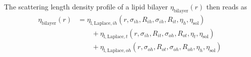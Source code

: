 The scattering length density profile of a lipid bilayer $\eta_\mathrm{bilayer}(r)$ then reads as
\begin{align}\label{eq:eta_bilayer_smoothed}
  \eta_\mathrm{bilayer}(r) & =  \eta_{\mathrm{l,Laplace},ih}(r,\sigma_{ih},R_{ih},\sigma_{ih},R_{it},\eta_h,\eta_\mathrm{sol}) \nonumber \\
   & \qquad + \eta_{\mathrm{l,Laplace},t}(r,\sigma_{ih},R_{it},\sigma_{oh},R_{ot},\eta_t,\eta_\mathrm{sol}) \\
   & \qquad + \eta_{\mathrm{l,Laplace},oh}(r,\sigma_{oh},R_{ot},\sigma_{oh},R_{oh},\eta_h,\eta_\mathrm{sol}) \nonumber
\end{align} 